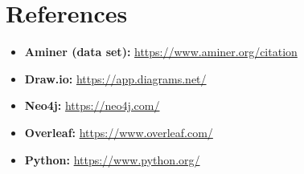 \documentclass{Configuration_Files/PoliMi3i_thesis}
\begin{document}
\chapter{References}
\label{ch:references}
\begin{itemize}
    \item \textbf{Aminer (data set):} \href{https://www.aminer.org/citation}{https://www.aminer.org/citation}
    \item \textbf{Draw.io:} \href{https://app.diagrams.net/}{https://app.diagrams.net/}
    \item \textbf{Neo4j:} \href{https://neo4j.com/}{https://neo4j.com/}
    \item \textbf{Overleaf:} \href{https://www.overleaf.com/}{https://www.overleaf.com/}
    \item \textbf{Python:} \href{https://www.python.org/}{https://www.python.org/}
\end{itemize}
\end{document}

